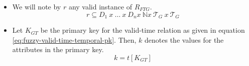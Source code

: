 \documentclass{llncs}
\newcommand{\T}{\mathcal{T}}
\begin{document}
\begin{definition}
\begin{itemize}
\item We will note by $r$ any valid instance of $R_{FTG}$. 
      \begin{equation}
       \label{eq:fuzzy-valid-time-instance}
      r \subseteq D_1\ x\ \ldots\ x\ D_n x\ \mathbb{N}  x\  \T_G\  x\ \T_G 
      \end{equation}

% 
% 
% 
    \item Let $K_{GT}$ be the primary key for the valid-time relation as given in equation \eqref{eq:fuzzy-valid-time-temporal-pk}. Then, $k$ denotes the values for the attributes in the primary key.
	  \begin{equation}
	   \label{eq:fuzzy-value-pk}
	  k = t\left[K_{GT} \right]
	  \end{equation}
% 
% 
% 
\end{itemize}


\end{definition}
\end{document}
